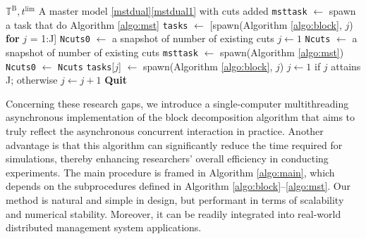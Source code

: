 \documentclass[journal]{IEEEtran}
\begin{document}
\begin{algorithm}
    \caption{The Main Procedure}\label{algo:main}
    \begin{algorithmic}[1]
    \Require $\mathbb{T}^\mathrm{B}, t^\text{lim}$ 
    \Ensure A master model \eqref{mstdual}\eqref{mstdual1} with cuts added
    \State \texttt{msttask} $\gets$ spawn a task that do Algorithm \ref{algo:mst} \label{line:callmst1}
    \State \texttt{tasks} $\gets$ [spawn(Algorithm \ref{algo:block}, $j$) \textbf{for} $j$ = 1:J] \label{line:callblock1}
    \State \texttt{Ncuts0} $\gets$ a snapshot of number of existing cuts
    \State $j \gets 1$  \label{line:j1}
     \label{line:telapsed}
            \State \texttt{Ncuts} $\gets$ a snapshot of number of existing cuts \label{line:monitorcut}
             \label{line:hasnewcuts}
                    \State \texttt{msttask} $\gets$ spawn(Algorithm \ref{algo:mst}) \label{line:callmst}
                    \State \texttt{Ncuts0} $\gets$ \texttt{Ncuts} \label{line:resetncuts0}
                \EndIf
            \EndIf
        \EndIf
                \State \texttt{tasks}[$j$] $\gets$ spawn(Algorithm \ref{algo:block}, $j$) \label{line:callblock}
            \EndIf
            \State $j \gets 1$ if $j$ attains J; otherwise $j \gets j+1$ \label{line:jnext}
        \EndWhile
    \EndWhile 
    \State \textbf{Quit}
    \end{algorithmic}
\end{algorithm}
\par
Concerning these research gaps, we introduce a single-computer
multithreading asynchronous implementation of the block decomposition algorithm
that aims to truly reflect the asynchronous concurrent interaction in practice.
Another advantage is that this algorithm can significantly reduce the time required
for simulations, thereby enhancing researchers' overall efficiency in conducting experiments.
The main procedure is framed in Algorithm \ref{algo:main}, which depends on the
subprocedures defined in Algorithm \ref{algo:block}--\ref{algo:mst}.
Our method is natural and simple in design, but performant
in terms of scalability and numerical stability.
Moreover, it can be readily integrated into real-world distributed management system applications.
\end{document}
